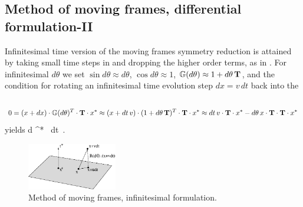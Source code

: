 \subsection{Method of moving frames, differential formulation-II}
\label{sec:MovFrameODE-II}


\noindent
Infinitesimal time version of the moving frames symmetry
reduction is attained by taking small time steps in
 and dropping the higher order terms, as
in . For infinitesimal  $d\theta$ we
set $\sin d\theta \approx d\theta$, $\cos d\theta \approx
1$, $\mathbb{G}(d\theta) \approx {1}+ d\theta \, \mathbf{T} $, and
the condition  for rotating an infinitesimal
time evolution step $dx = v\,dt$ back into the \slice\
\[
0 = (x + dx) \cdot \mathbb{G}(d\theta)^T \cdot \mathbf{T} \cdot x^{*}
  \approx (x + dt\,v) \cdot (1+ d\theta\,\mathbf{T})^T \cdot \mathbf{T} \cdot x^{*}
  \approx dt\,v \cdot \mathbf{T} \cdot x^{*} - d\theta\,x \cdot \mathbf{T} \cdot \mathbf{T} \cdot x^{*}
\]
yields
\beq
d\theta \approx {}
                     { \ssp \cdot \Lg \cdot \Lg \cdot \ssp^{*}} \,  dt
\,.

\begin{figure}[ht]
  \begin{center}
  \includegraphics[width=0.35\textwidth]{../figs/infMF}     
  \caption{Method of moving frames, infinitesimal formulation.}
  \end{center}
 \label{fig:infMF}
\end{figure}

